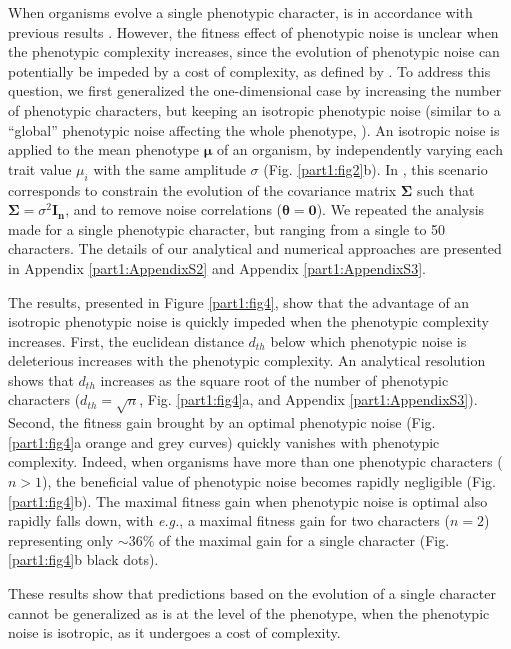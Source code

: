 When organisms evolve a single phenotypic character, {\sigmaFGM} is in accordance with previous results \citep{zhang-et-al-2009,eldar-and-elowitz-2010,bodi-et-al-2017}. However, the fitness effect of phenotypic noise is unclear when the phenotypic complexity increases, since the evolution of phenotypic noise can potentially be impeded by a cost of complexity, as defined by \cite{fisher-1930}. To address this question, we first generalized the one-dimensional case by increasing the number of phenotypic characters, but keeping an isotropic phenotypic noise (similar to a ``global'' phenotypic noise affecting the whole phenotype, \citealt{yvert-et-al-2013}). An isotropic noise is applied to the mean phenotype $\boldsymbol{\mu}$ of an organism, by independently varying each trait value $\mu_i$ with the same amplitude $\sigma$ (Fig. \ref{part1:fig2}b).
In {\sigmaFGM}, this scenario corresponds to constrain the evolution of the covariance matrix $\boldsymbol{\Sigma}$ such that $\boldsymbol{\Sigma} = \sigma^2 \boldsymbol{I_n}$, and to remove noise correlations ($\boldsymbol{\theta} = \boldsymbol{0}$).
We repeated the analysis made for a single phenotypic character, but ranging from a single to 50 characters. The details of our analytical and numerical approaches are presented in Appendix \ref{part1:AppendixS2} and Appendix \ref{part1:AppendixS3}.

The results, presented in Figure \ref{part1:fig4}, show that the advantage of an isotropic phenotypic noise is quickly impeded when the phenotypic complexity increases. First, the euclidean distance $d_{th}$ below which phenotypic noise is deleterious increases with the phenotypic complexity. An analytical resolution shows that $d_{th}$ increases as the square root of the number of phenotypic characters ($d_{th} = \sqrt{n}$, Fig. \ref{part1:fig4}a, and Appendix \ref{part1:AppendixS3}).
Second, the fitness gain brought by an optimal phenotypic noise (Fig. \ref{part1:fig4}a orange and grey curves) quickly vanishes with phenotypic complexity. Indeed, when organisms have more than one phenotypic characters ($n>1$), the beneficial value of phenotypic noise becomes rapidly negligible (Fig. \ref{part1:fig4}b). The maximal fitness gain when phenotypic noise is optimal also rapidly falls down, with \textit{e.g.}, a maximal fitness gain for two characters ($n=2$) representing only $\sim36\%$ of the maximal gain for a single character (Fig. \ref{part1:fig4}b black dots).

These results show that predictions based on the evolution of a single character cannot be generalized as is at the level of the phenotype, when the phenotypic noise is isotropic, as it undergoes a cost of complexity.

